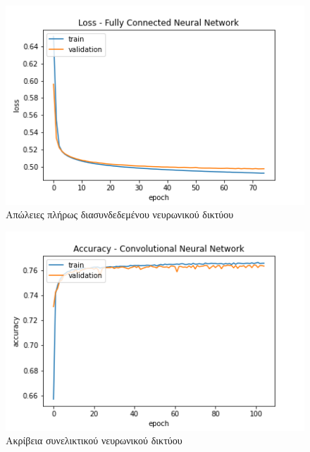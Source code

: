 \begin{figure}[H]
  \centering
  \includegraphics[width=1\textwidth]{images/DNNloss.png}
  \caption{Απώλειες πλήρως διασυνδεδεμένου νευρωνικού δικτύου}
  \label{fig:DNNloss}
\end{figure}

\begin{figure}[H]
  \centering
  \includegraphics[width=1\textwidth]{images/CNNacc.png}
  \caption{Ακρίβεια συνελικτικού νευρωνικού δικτύου}
  \label{fig:CNNacc}
\end{figure}

